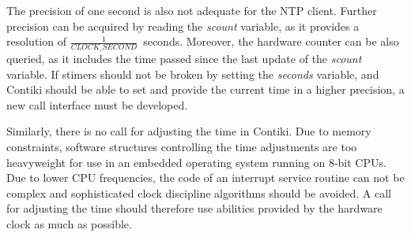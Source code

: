 The precision of one second is also not adequate for the NTP client.
Further precision can be acquired by reading the {\it{scount}} variable,
as it provides a resolution of $\frac{1}{CLOCK\_SECOND}$~seconds.
Moreover, the hardware counter can be also queried, as it includes the time passed since
the last update of the {\it{scount}} variable.
If stimers should not be broken by setting the {\it{seconds}} variable,
and Contiki should be able to set and provide the current time in a higher precision,
a new call interface must be developed.

Similarly, there is no call for adjusting the time in Contiki.
Due to memory constraints, software structures controlling the time adjustments are too heavyweight
for use in an embedded operating system running on 8-bit CPUs.
Due to lower CPU frequencies, the code of an interrupt service routine can not be complex
and sophisticated clock discipline algorithms should be avoided.
A call for adjusting the time should therefore use abilities
provided by the hardware clock as much as possible.
